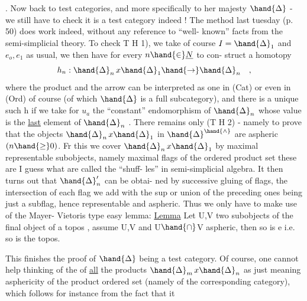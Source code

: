 .  Now back to test categories,  and more specifically to her majesty
$\hand{\Delta}$ -  we still have to check it is a test category indeed !  The method 
last tuesday (p. 50) does work indeed,  without any reference to ``well-
known'' facts from the semi-simplicial theory.  To check  T H 1),  we take
of course $I = \hand{\Delta}_1$ and $e_o , e_1$ as usual,  we then have for every $n \hand{\in} \underline{N}$ to con-
struct a homotopy 
\[ h_n : \hand{\Delta}_n \, x \hand{\Delta}_1 \hand{\rightarrow} \hand{\Delta}_n \quad , \]
where the product and the arrow can be interpreted as one in (Cat) or even
in (Ord) of course  (of which $\hand{\Delta}$ is a full subcategory),  and there is a
unique such h if we take for $u_a$ the ``constant'' endomorphism of $\hand{\Delta}_n$ whose
\margin{*}value is the \uline{last} element of $\hand{\Delta}_n$ . There remains only (T H 2) - namely
to prove that the objects $\hand{\Delta}_n \, x \hand{\Delta}_1$ in $\hand{\Delta}^{\hand{\wedge}}$ are aspheric $(n \hand{\geq} 0)$.  Fr this
we cover  $\hand{\Delta}_n \, x \hand{\Delta}_1$ by maximal representable subobjects,  namely maximal flags
of the ordered product set\hand{(}  these are I guess what are called the ``shuff-
les'' in semi-simplicial algebra\hand{)}. It then turns out that $\hand{\Delta}'_n$ can be obtai-
ned by successive gluing of flags,  the intersection of each flag we add
with the sup or union of the preceding ones being just a subflag,  hence
representable and aspheric.  Thus we only have to make use of the Mayer-
Vietoris type easy lemma:
\uline{Lemma}  Let  U,V two subobjects of the final object  of a topos ,  assume
U,V and U$\hand{\cap}$V aspheric,  then so is e\hand{,} i.e. so is the topos.

This finishes the proof of $\hand{\Delta}$ being a test category.  Of course,  one
cannot help thinking of the   of \uline{all} the products $\hand{\Delta}_m \, x \hand{\Delta}_n$
as just meaning asphericity of the product ordered set (namely of the
corresponding category),  which follows for instance from the fact that it
